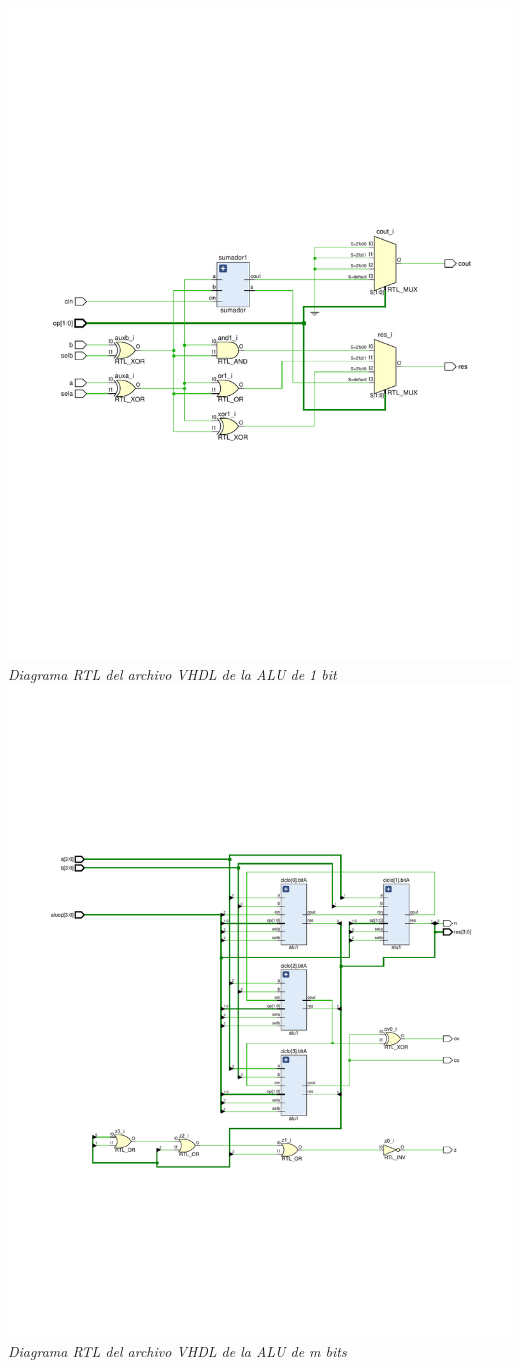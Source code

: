 \documentclass[12pt,executivepaper]{article}
\begin{document}
\begin{center}
    \includegraphics[scale=0.7]{sources/schematicRLT-ALU1.pdf}
    \textit{Diagrama RTL del archivo VHDL de la ALU de 1 bit}
    \includegraphics[scale=0.7]{sources/schematicRTL-ALUN.pdf}
    \textit{Diagrama RTL del archivo VHDL de la ALU de m bits}
\end{center}
\end{document}
